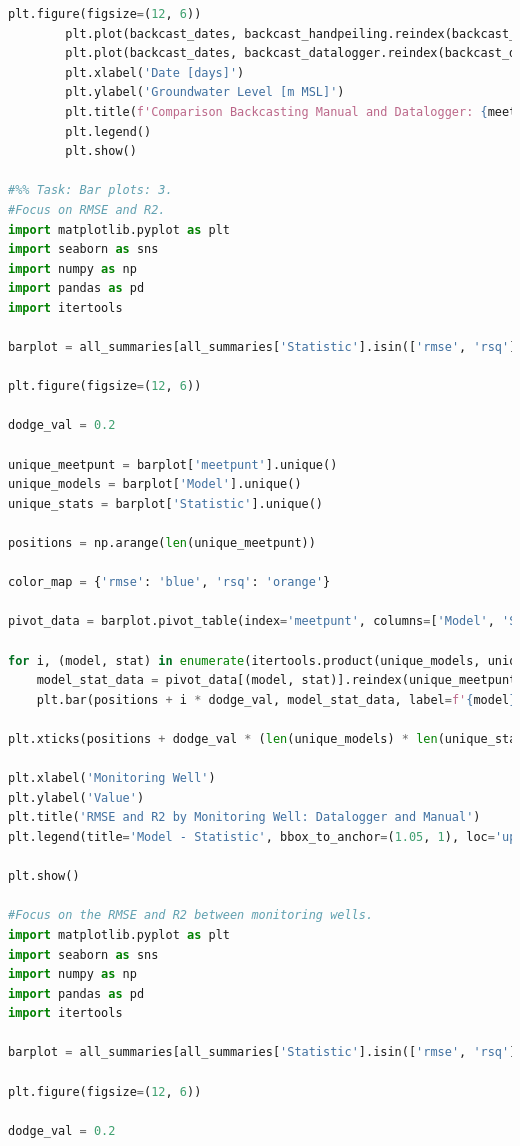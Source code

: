 \begin{lstlisting}[language=Python]
        plt.figure(figsize=(12, 6))
        plt.plot(backcast_dates, backcast_handpeiling.reindex(backcast_dates), label='Manual', color='cyan')
        plt.plot(backcast_dates, backcast_datalogger.reindex(backcast_dates), label='Datalogger', color='pink')
        plt.xlabel('Date [days]')
        plt.ylabel('Groundwater Level [m MSL]')
        plt.title(f'Comparison Backcasting Manual and Datalogger: {meetpunt}')
        plt.legend()
        plt.show()

#%% Task: Bar plots: 3.
#Focus on RMSE and R2.
import matplotlib.pyplot as plt
import seaborn as sns
import numpy as np
import pandas as pd
import itertools  

barplot = all_summaries[all_summaries['Statistic'].isin(['rmse', 'rsq'])]

plt.figure(figsize=(12, 6))

dodge_val = 0.2

unique_meetpunt = barplot['meetpunt'].unique()
unique_models = barplot['Model'].unique()
unique_stats = barplot['Statistic'].unique()

positions = np.arange(len(unique_meetpunt))

color_map = {'rmse': 'blue', 'rsq': 'orange'}

pivot_data = barplot.pivot_table(index='meetpunt', columns=['Model', 'Statistic'], values='Value', fill_value=0)

for i, (model, stat) in enumerate(itertools.product(unique_models, unique_stats)):
    model_stat_data = pivot_data[(model, stat)].reindex(unique_meetpunt, fill_value=0)
    plt.bar(positions + i * dodge_val, model_stat_data, label=f'{model} - {stat}', width=dodge_val)

plt.xticks(positions + dodge_val * (len(unique_models) * len(unique_stats) - 1) / 2, unique_meetpunt, rotation=45)

plt.xlabel('Monitoring Well')
plt.ylabel('Value')
plt.title('RMSE and R2 by Monitoring Well: Datalogger and Manual')
plt.legend(title='Model - Statistic', bbox_to_anchor=(1.05, 1), loc='upper left')

plt.show()

#Focus on the RMSE and R2 between monitoring wells.
import matplotlib.pyplot as plt
import seaborn as sns
import numpy as np
import pandas as pd
import itertools

barplot = all_summaries[all_summaries['Statistic'].isin(['rmse', 'rsq'])]

plt.figure(figsize=(12, 6))

dodge_val = 0.2  


\end{lstlisting}
